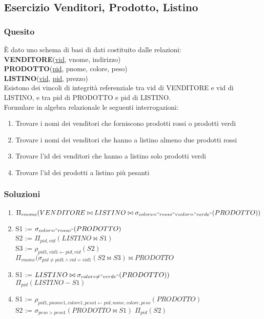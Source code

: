 \subsection{Esercizio Venditori, Prodotto, Listino}
\subsubsection{Quesito}

È dato uno schema di basi di dati costituito dalle relazioni: \\

\indent \textbf{VENDITORE}(\underline{vid}, vnome, indirizzo) \\
\indent \textbf{PRODOTTO}(\underline{pid}, pnome, colore, peso) \\
\indent \textbf{LISTINO}(\underline{vid}, \underline{pid}, prezzo) \\

Esistono dei vincoli di integrità referenziale tra vid di VENDITORE
e vid di LISTINO, e tra pid di PRODOTTO e pid di LISTINO. \\

Formulare in algebra relazionale le seguenti interrogazioni:
\begin{enumerate}
  \item Trovare i nomi dei venditori che forniscono prodotti rossi o prodotti verdi
  \item Trovare i nomi dei venditori che hanno a listino almeno due prodotti rossi
  \item Trovare l'id dei venditori che hanno a listino solo prodotti verdi
  \item Trovare l'id dei prodotti a listino più pesanti
\end{enumerate}

\subsubsection{Soluzioni}

\begin{enumerate}
  \item $\Pi_{vnome}(VENDITORE \bowtie LISTINO \bowtie \sigma_{colore="rosso" \lor color="verde"}(PRODOTTO))$
  \item
    S1 := $\sigma_{color="rosso"}(PRODOTTO)$ \\
    S2 := $\Pi_{pid,vid}(LISTINO \bowtie S1)$ \\
    S3 := $\rho_{pid1,vid1 \leftarrow pid,vid}(S2)$ \\
    $\Pi_{vnome}(\sigma_{pid \neq pid1 \land vid = vid1}(S2 \bowtie S3) \bowtie PRODOTTO$
  \item
    S1 := $LISTINO \bowtie \sigma_{colore \neq "verde"} (PRODOTTO))$ \\
    $\Pi_{pid}(LISTINO - S1)$
  \item
    S1 := $\rho_{pid1,pnome1,colore1,peso1 \leftarrow pid,nome,colore,peso}(PRODOTTO)$ \\
    S2 := $\sigma_{peso>peso1}(PRODOTTO \bowtie S1)$
    $\Pi_{pid}(S2)$
\end{enumerate}